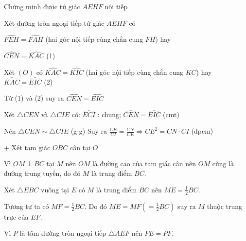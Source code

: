 \begin{ex}
{{\begin{center}
			
			
		\end{center}
		Chứng minh được tứ giác $AEHF$ nội tiếp
		
		Xét đường tròn ngoại tiếp tứ giác $AEHF$ có
		
		$\widehat{FEH} = \widehat{FAH}$ (hai góc nội tiếp cùng chắn cung $FH$) hay
		
		$\widehat{CEN} = \widehat{KAC}$ (1)
		
		Xét $(O)$ có $\widehat{KAC} = \widehat{KIC}$ (hai góc nội tiếp cùng chắn cung $KC$) hay $\widehat{KAC} = \widehat{EIC}$ (2)
		
		Từ (1) và (2) suy ra $\widehat{CEN} = \widehat{EIC}$
		
		Xét $\triangle CEN$ và $\triangle CIE$ có: $\widehat{ECI}$ : chung; $\widehat{CEN} = \widehat{EIC}$ (cmt)
		
		Nên $\triangle CEN \sim \triangle CIE$ (g-g) Suy ra $\frac{CE}{CI} = \frac{CN}{CE} \Rightarrow CE^2 = CN \cdot CI$ (đpcm)
		
		+ Xét tam giác $OBC$ cân tại $O$
		
		Vì $OM \perp BC$ tại $M$ nên $OM$ là đường cao của tam giác cân nên $OM$ cũng là đường trung tuyến, do đó $M$ là trung điểm $BC$.
		
		Xét $\triangle EBC$ vuông tại $E$ có $M$ là trung điểm $BC$ nên $ME = \frac{1}{2}BC$.
		
		Tương tự ta có $MF = \frac{1}{2}BC$. Do đó $ME = MF (= \frac{1}{2}BC)$ suy ra $M$ thuộc trung trực của $EF$.
		
		Vì $P$ là tâm đường tròn ngoại tiếp $\triangle AEF$ nên $PE = PF$.
		
}}
\end{ex}
